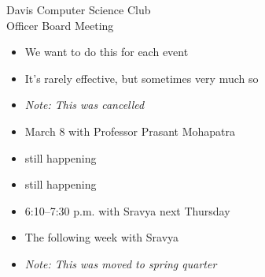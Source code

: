 \documentclass{article}
\begin{document}
\begin{Minutes}{Davis Computer Science Club\\Officer Board Meeting}
\begin{itemize}
\item We want to do this for each event
\item It's rarely effective, but sometimes very much so
\end{itemize}
\begin{itemize}
\item \textit{Note: This was cancelled}
\item March 8 with Professor Prasant Mohapatra
\end{itemize}
\begin{itemize}
\item still happening
\end{itemize}
\begin{itemize}
\item still happening
\end{itemize}
\begin{itemize}
\item 6:10--7:30 p.m. with Sravya next Thursday
\end{itemize}
\begin{itemize}
\item The following week with Sravya
\end{itemize}
\begin{itemize}
\item \textit{Note: This was moved to spring quarter}
\end{itemize}
\thispagestyle{creditfooter}
\end{Minutes}
\end{document}
